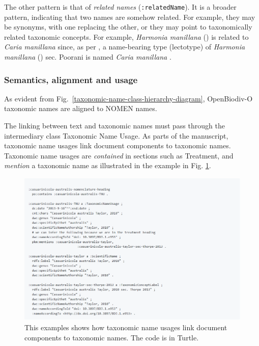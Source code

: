 The other pattern is that of \emph{related names} ({\tt :relatedName}). It is a broader pattern, indicating that two names are somehow related. For example, they may be synonyms, with one replacing the other, or they may point to taxonomically related taxonomic concepts. For example, \emph{Harmonia manillana} (\cite{mulsant_monographie_1866}) is related to \emph{Caria manillana} \cite{mulsant_monographie_1866} since, as per \cite{poorani_harmonia_2016}, a name-bearing type (lectotype) of \emph{Harmonia manillana} (\cite{mulsant_monographie_1866}) sec. Poorani \cite{poorani_harmonia_2016} is named \emph{Caria manillana} \cite{mulsant_monographie_1866}.

\subsubsection*{Semantics, alignment and usage}
As evident from Fig.~\ref{taxonomic-name-class-hierarchy-diagram}, OpenBiodiv-O taxonomic names are aligned to NOMEN names.

The linking between text and taxonomic names must pass through the intermediary class Taxonomic Name Usage. As parts of the manuscript, taxonomic name usages link document components to taxonomic names. Taxonomic name usages are \emph{contained} in sections such as Treatment, and \emph{mention} a taxonomic name as illustrated in the example in Fig. \ref{example-taxonomic-name-usage}.

\begin{figure}[h!]
\centering
  \includegraphics[width=\textwidth]{Figures/example-taxonomic-name-usage}
  \decoRule
  \caption[Example taxonomic name usage.]{
  This examples shows how taxonomic name usages link document components to taxonomic names. The code is in Turtle.}
  \label{example-taxonomic-name-usage}
\end{figure}

